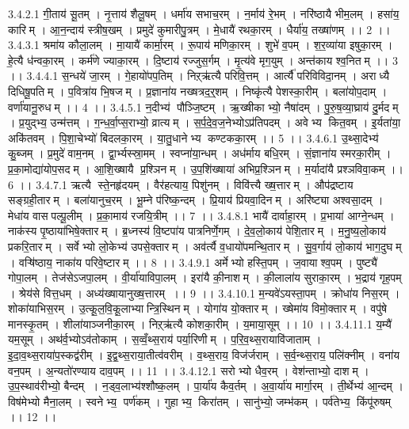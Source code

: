3.4.2.1
गी॒ताय॑ सू॒तम् । नृ॒त्ताय॑ शैलू॒षम् । धर्मा॑य सभाच॒रम् । न॒र्माय॑ रे॒भम् । नरि॑ष्ठायै भीम॒लम् । हसा॑य॒ कारिम् । आ॒न॒न्दाय॑ स्त्रीष॒खम् । प्रमुदे॑ कुमारीपु॒त्रम् । मे॒धायै॑ रथका॒रम् । धैर्या॑य॒ तख्षा॑णम् ।। 2 ।।
3.4.3.1
श्रमा॑य कौला॒लम् । मा॒यायै॑ कार्मा॒रम् । रू॒पाय॑ मणिका॒रम् । शुभे॑ व॒पम् । श॒र॒व्या॑या इषुका॒रम् । हे॒त्यै ध॑न्वका॒रम् । कर्म॑णे ज्याका॒रम् । दि॒ष्टाय॑ रज्जुस॒र्गम् । मृ॒त्य॑वे मृग॒युम् । अन्त॑काय श्व॒नितम् ।। 3 ।।
3.4.4.1
स॒न्धये॑ जा॒रम् । गे॒हायो॑पप॒तिम् । निऱ्ऋ॑त्यै परिवि॒त्तम् । आर्त्यै॑ परिविविदा॒नम् । अराध्यै दिधिषू॒पतिम् । प॒वित्रा॑य भि॒षजम् । प्र॒ज्ञाना॑य नख्षत्रद॒र्॒शम् । निष्कृ॑त्यै पेशस्का॒रीम् । बला॑योप॒दाम् । वर्णा॑यानू॒रुधम् ।। 4 ।।
3.4.5.1
न॒दीभ्य॑ पौञ्जि॒ष्टम् । ऋ॒ख्षीकाभ्यो॒ नैषा॑दम् । पु॒रु॒ष॒व्या॒घ्राय॑ दु॒र्मदम् । प्र॒युद्भ्य॒ उन्म॑त्तम् । ग॒न्ध॒र्वा॒प्स॒राभ्यो॒ व्रात्यम् । स॒र्प॒दे॒व॒ज॒नेभ्योऽप्र॑तिपदम् । अवेभ्य कित॒वम् । इ॒र्यता॑या॒ अकि॑तवम् । पि॒शा॒चेभ्यो॑ बिदलका॒रम् । या॒तु॒धानेभ्य कण्टकका॒रम् ।। 5 ।।
3.4.6.1
उ॒थ्सा॒देभ्य॑ कु॒ब्जम् । प्र॒मुदे॑ वाम॒नम् । द्वा॒र्भ्यस्स्रा॒मम् । स्वप्ना॑या॒न्धम् । अध॑र्माय बधि॒रम् । सं॒ज्ञाना॑य स्मरका॒रीम् । प्र॒का॒मोद्या॑योप॒सदम् । आ॒शि॒ख्षायै प्र॒श्ञिनम् । उ॒प॒शि॑ख्षाया॑ अभिप्र॒श्ञिनम् । म॒र्यादा॑यै प्रश्ञविवा॒कम् ।। 6 ।।
3.4.7.1
ऋत्यै स्ते॒नहृ॑दयम् । वैर॑हत्याय॒ पिशु॑नम् । विवि॑त्त्यै ख्ष॒त्तारम् । औप॑द्रष्टाय सङ्ग्रही॒तारम् । बला॑यानुच॒रम् । भू॒म्ने प॑रिष्क॒न्दम् । प्रि॒याय॑ प्रियवा॒दिनम् । अरि॑ष्ट्या अश्वसा॒दम् । मेधा॑य वासपल्पू॒लीम् । प्र॒का॒माय॑ रजयि॒त्रीम् ।। 7 ।।
3.4.8.1
भायै॑ दार्वाहा॒रम् । प्र॒भाया॑ आग्ने॒न्धम् । नाक॑स्य पृ॒ष्ठाया॑भिषे॒क्तारम् । ब्र॒ध्नस्य॑ वि॒ष्टपा॑य पात्रनिर्णे॒गम् । दे॒व॒लो॒काय॑ पेशि॒तारम् । म॒नु॒ष्य॒लो॒काय॑ प्रकरि॒तारम् । सर्वेभ्यो लो॒केभ्य॑ उपसे॒क्तारम् । अव॑र्त्यै व॒धायो॑पमन्थि॒तारम् । सु॒व॒र्गाय॑ लो॒काय॑ भाग॒दुघम् । वऱ्षि॑ष्ठाय॒ नाका॑य परिवे॒ष्टारम् ।। 8 ।।
3.4.9.1
अर्मेभ्यो हस्ति॒पम् । ज॒वायाश्व॒पम् । पुष्ट्यै॑ गोपा॒लम् । तेज॑सेऽजपा॒लम् । वी॒र्या॑याविपा॒लम् । इरा॑यै की॒नाशम् । की॒लाला॑य सुराका॒रम् । भ॒द्राय॑ गृह॒पम् । श्रेय॑से वित्त॒धम् । अध्य॑ख्षायानुख्ष॒त्तारम् ।। 9 ।।
3.4.10.1
म॒न्यवे॑ऽयस्ता॒पम् । क्रोधा॑य निस॒रम् । शोका॑याभिस॒रम् । उ॒त्कू॒ल॒वि॒कू॒लाभ्यान्त्रि॒स्थिनम् । योगा॑य यो॒क्तारम् । ख्षेमा॑य विमो॒क्तारम् । वपु॑षे मानस्कृ॒तम् । शीला॑याञ्जनीका॒रम् । निऱ्ऋ॑त्यै कोशका॒रीम् । य॒माया॒सूम् ।। 10 ।।
3.4.11.1
य॒म्यै॑ यम॒सूम् । अथ॑र्व॒भ्योऽव॑तोकाम् । स॒व्वँ॒थ्स॒राय॑ पर्या॒रिणीम् । प॒रि॒व॒थ्स॒रायावि॑जाताम् । इ॒दा॒व॒थ्स॒राया॑प॒स्कद्व॑रीम् । इ॒द्व॒थ्स॒राया॒तीत्व॑वरीम् । व॒थ्स॒राय॒ विज॑र्जराम् । स॒र्व॒न्थ्स॒राय॒ पलि॑क्नीम् । वना॑य वन॒पम् । अ॒न्यतो॑रण्याय दाव॒पम् ।। 11 ।।
3.4.12.1
सरोभ्यो धैव॒रम् । वेश॑न्ताभ्यो॒ दाशम् । उ॒प॒स्थाव॑रीभ्यो॒ बैन्दम् । न॒ड्व॒लाभ्य॑श्शौष्क॒लम् । पा॒र्या॑य कैव॒र्तम् । अ॒वा॒र्या॑य मार्गा॒रम् । ती॒र्थेभ्य॑ आ॒न्दम् । विष॑मेभ्यो मैना॒लम् । स्वनेभ्य॒ पर्ण॑कम् । गुहाभ्य॒ किरा॑तम् । सानु॑भ्यो॒ जम्भ॑कम् । पर्व॑तेभ्य॒ किंपू॑रुषम् ।। 12 ।।
